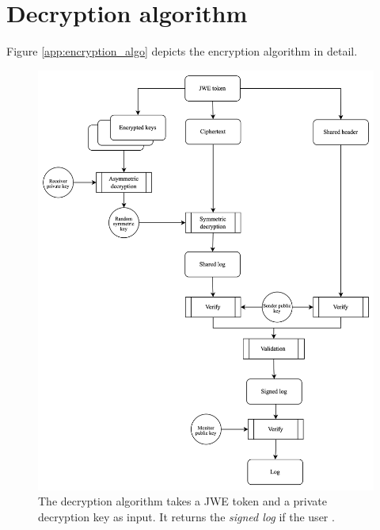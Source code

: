 \documentclass[../main.tex]{subfiles}
\begin{document}
\section{Decryption algorithm}
\label{app:decryption}
Figure \ref{app:encryption_algo} depicts the encryption algorithm in detail.
\begin{figure}[h]
    \includegraphics[scale=0.15]{../img/05/decrypt_logs.jpg}
    \centering
    \caption{The decryption algorithm takes a JWE token and a private decryption key as input. It returns the \textit{signed log} if the user .}
    \label{app:decryption_algo}
\end{figure}
\end{document}
